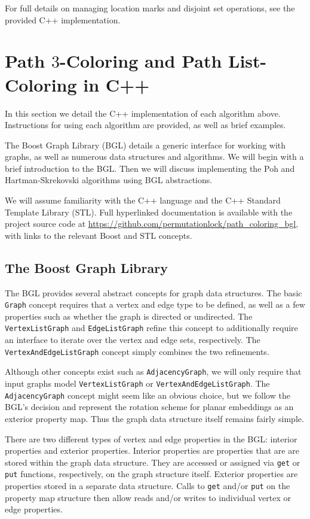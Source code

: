 \documentclass[letterpaper, 12pt]{article}
\theoremstyle{definition}
\theoremstyle{definition}
\theoremstyle{thm}
\theoremstyle{definition}
\begin{document}
For full details on managing location marks and disjoint set operations, see the
provided C++ implementation.

\section{Path $3$-Coloring and Path List-Coloring in C++}

In this section we detail the C++ implementation of each algorithm above.
Instructions for using each algorithm are provided, as well as brief examples.

The Boost Graph Library (BGL) \cite{boost} details a generic interface for working
with graphs, as well as numerous data structures and algorithms. We will begin
with a brief introduction to the BGL. Then we will
discuss implementing the Poh and Hartman-Skrekovski algorithms using BGL
abstractions.

We will assume familiarity with the C++ language and the
C++ Standard Template Library (STL). Full hyperlinked documentation is
available with the project source code at
\url{https://github.com/permutationlock/path_coloring_bgl},
with links to the relevant Boost and STL concepts.

\subsection{The Boost Graph Library}

The BGL provides several abstract concepts for graph data structures.
The basic \texttt{Graph} concept requires that a vertex and edge type to be
defined, as well as a few properties such as whether the graph is directed or
undirected. The \texttt{VertexListGraph} and \texttt{EdgeListGraph} refine this
concept to additionally require an interface to iterate over the vertex and
edge sets, respectively. The \texttt{VertexAndEdgeListGraph} concept simply
combines the two refinements.

Although other concepts exist such as
\texttt{AdjacencyGraph}, we will only require that input graphs model
\texttt{VertexListGraph} or \texttt{VertexAndEdgeListGraph}. The
\texttt{Adjacency{\allowbreak}Graph} concept might seem like an obvious choice,
but we follow the BGL's decision and represent the rotation scheme for planar
embeddings as an exterior property map. Thus the graph data structure itself
remains fairly simple.

There are two different types of vertex and edge properties in the BGL: interior
properties and exterior properties. Interior properties are properties that are
are stored within the graph data structure. They are accessed or
assigned via \texttt{get} or \texttt{put} functions, respectively, on the graph
structure itself. Exterior properties are properties stored in a separate data
structure. Calls to \texttt{get} and/or \texttt{put} on the property map structure
then allow reads and/or writes to individual vertex or edge properties.
\end{document}
